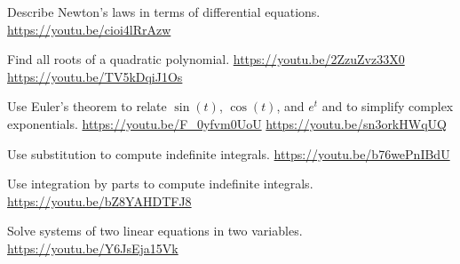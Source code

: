 \begin{readinessAssuranceResources}
\item Describe Newton’s laws in terms of differential equations. \url{https://youtu.be/cioi4lRrAzw}
\item Find all roots of a quadratic polynomial. \url{https://youtu.be/2ZzuZvz33X0} \url{https://youtu.be/TV5kDqiJ1Os}
\item Use Euler’s theorem to relate \(\sin(t)\), \(\cos(t)\), and \(e^t\)  and to simplify complex exponentials.  \url{https://youtu.be/F_0yfvm0UoU} \url{https://youtu.be/sn3orkHWqUQ}
\item Use substitution to compute indefinite integrals. \url{https://youtu.be/b76wePnIBdU}
\item Use integration by parts to compute indefinite integrals. \url{https://youtu.be/bZ8YAHDTFJ8}
\item Solve systems of two linear equations in two variables.  \url{https://youtu.be/Y6JsEja15Vk}

\end{readinessAssuranceResources}
